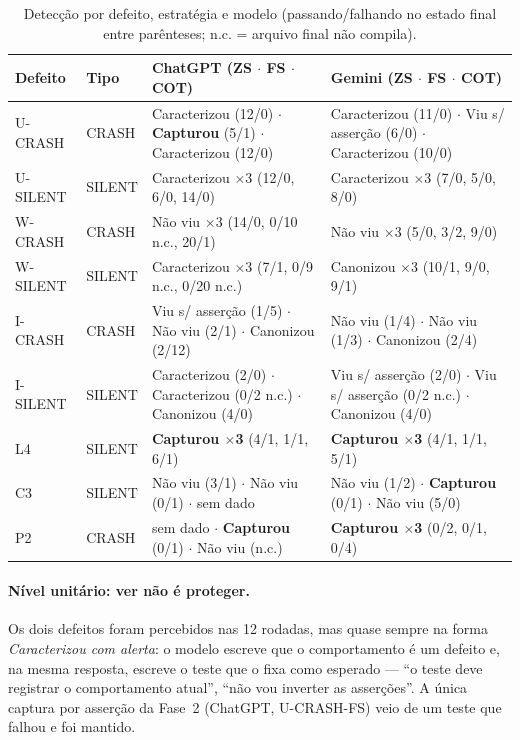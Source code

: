 \documentclass[12pt]{article}
\begin{document}
\begin{table}[H]
\centering
\caption{Detecção por defeito, estratégia e modelo (passando/falhando no estado final entre parênteses; n.c. = arquivo final não compila).}
\label{tab:deteccao-bug}
\scriptsize
\setlength{\tabcolsep}{3pt}
\begin{tabular}{llP{5.4cm}P{5.4cm}}
\toprule
\textbf{Defeito} & \textbf{Tipo} & \textbf{ChatGPT (ZS $\cdot$ FS $\cdot$ COT)} & \textbf{Gemini (ZS $\cdot$ FS $\cdot$ COT)} \\
\midrule
U-CRASH  & CRASH  & Caracterizou (12/0) $\cdot$ \textbf{Capturou} (5/1) $\cdot$ Caracterizou (12/0) & Caracterizou (11/0) $\cdot$ Viu s/ asserção (6/0) $\cdot$ Caracterizou (10/0) \\
U-SILENT & SILENT & Caracterizou $\times$3 (12/0, 6/0, 14/0) & Caracterizou $\times$3 (7/0, 5/0, 8/0) \\
W-CRASH  & CRASH  & Não viu $\times$3 (14/0, 0/10 n.c., 20/1) & Não viu $\times$3 (5/0, 3/2, 9/0) \\
W-SILENT & SILENT & Caracterizou $\times$3 (7/1, 0/9 n.c., 0/20 n.c.) & Canonizou $\times$3 (10/1, 9/0, 9/1) \\
I-CRASH  & CRASH  & Viu s/ asserção (1/5) $\cdot$ Não viu (2/1) $\cdot$ Canonizou (2/12) & Não viu (1/4) $\cdot$ Não viu (1/3) $\cdot$ Canonizou (2/4) \\
I-SILENT & SILENT & Caracterizou (2/0) $\cdot$ Caracterizou (0/2 n.c.) $\cdot$ Canonizou (4/0) & Viu s/ asserção (2/0) $\cdot$ Viu s/ asserção (0/2 n.c.) $\cdot$ Canonizou (4/0) \\
L4 & SILENT & \textbf{Capturou $\times$3} (4/1, 1/1, 6/1) & \textbf{Capturou $\times$3} (4/1, 1/1, 5/1) \\
C3 & SILENT & Não viu (3/1) $\cdot$ Não viu (0/1) $\cdot$ sem dado & Não viu (1/2) $\cdot$ \textbf{Capturou} (0/1) $\cdot$ Não viu (5/0) \\
P2 & CRASH  & sem dado $\cdot$ \textbf{Capturou} (0/1) $\cdot$ Não viu (n.c.) & \textbf{Capturou $\times$3} (0/2, 0/1, 0/4) \\
\bottomrule
\end{tabular}
\end{table}

\paragraph{Nível unitário: ver não é proteger.} Os dois defeitos foram
percebidos nas 12 rodadas, mas quase sempre na forma
\emph{Caracterizou com alerta}: o modelo escreve que o comportamento é um
defeito e, na mesma resposta, escreve o teste que o fixa como esperado ---
``o teste deve registrar o comportamento atual'', ``não vou inverter as
asserções''. A única captura por asserção da Fase~2 (ChatGPT, U-CRASH-FS)
veio de um teste que falhou e foi mantido.
\end{document}
